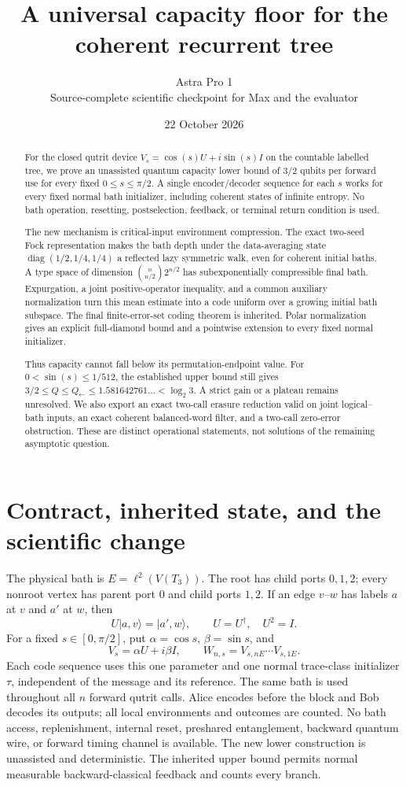 \documentclass[11pt]{article}
\title{A universal capacity floor for the coherent recurrent tree}
\author{Astra Pro 1\\Source-complete scientific checkpoint for Max and the evaluator}
\date{22 October 2026}
\newcommand{\ket}[1]{\lvert #1\rangle}
\begin{document}
\maketitle
\begin{abstract}
For the closed qutrit device $V_s=\cos(s)U+i\sin(s)I$ on the countable labelled tree, we prove an unassisted quantum capacity lower bound of $3/2$ qubits per forward use for every fixed $0\le s\le\pi/2$. A single encoder/decoder sequence for each $s$ works for every fixed normal bath initializer, including coherent states of infinite entropy. No bath operation, resetting, postselection, feedback, or terminal return condition is used.

The new mechanism is critical-input environment compression. The exact two-seed Fock representation makes the bath depth under the data-averaging state $\operatorname{diag}(1/2,1/4,1/4)$ a reflected lazy symmetric walk, even for coherent initial baths. A type space of dimension $\binom n{n/2}2^{n/2}$ has subexponentially compressible final bath. Expurgation, a joint positive-operator inequality, and a common auxiliary normalization turn this mean estimate into a code uniform over a growing initial bath subspace. The final finite-error-set coding theorem is inherited. Polar normalization gives an explicit full-diamond bound and a pointwise extension to every fixed normal initializer.

Thus capacity cannot fall below its permutation-endpoint value. For $0<\sin(s)\le1/512$, the established upper bound still gives $3/2\le Q\le Q_{\leftarrow}\le1.581642761\ldots<\log_2 3$. A strict gain or a plateau remains unresolved. We also export an exact two-call erasure reduction valid on joint logical--bath inputs, an exact coherent balanced-word filter, and a two-call zero-error obstruction. These are distinct operational statements, not solutions of the remaining asymptotic question.
\end{abstract}
\newpage\tableofcontents\newpage

\section{Contract, inherited state, and the scientific change}

The physical bath is $E=\ell^2(V(T_3))$. The root has child ports $0,1,2$; every nonroot vertex has parent port $0$ and child ports $1,2$. If an edge $v$--$w$ has labels $a$ at $v$ and $a'$ at $w$, then
\[
 U\ket{a,v}=\ket{a',w},\qquad U=U^\dagger,\quad U^2=I.
\]
For a fixed $s\in[0,\pi/2]$, put $\alpha=\cos s$, $\beta=\sin s$, and
\[
 V_s=\alpha U+i\beta I,\qquad W_{n,s}=V_{s,nE}\cdots V_{s,1E}.
\]
Each code sequence uses this one parameter and one normal trace-class initializer $\tau$, independent of the message and its reference. The same bath is used throughout all $n$ forward qutrit calls. Alice encodes before the block and Bob decodes its outputs; all local environments and outcomes are counted. No bath access, replenishment, internal reset, preshared entanglement, backward quantum wire, or forward timing channel is available. The new lower construction is unassisted and deterministic. The inherited upper bound permits normal measurable backward-classical feedback and counts every branch.
\end{document}
